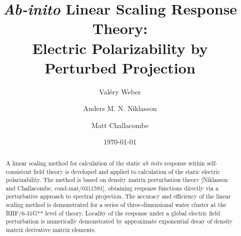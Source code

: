 \documentclass[prl,aps,preprint,showpacs,superbib]{revtex4}
\begin{document}
\title{\emph{Ab-inito} Linear Scaling Response Theory: \\ 
             Electric Polarizability by Perturbed Projection }

\author{Val\'ery Weber}
\author{Anders M. N. Niklasson}
\author{Matt Challacombe}

\date{\today}

\begin{abstract}
A linear scaling method for calculation of the static {\em ab inito} response within self-consistent field theory 
is developed and applied to calculation of the static electric polarizability.  The method is based on 
density matrix perturbation theory [Niklasson and Challacombe, cond-mat/0311591], obtaining  response functions
directly via a perturbative approach to spectral projection.
The accuracy and efficiency of the linear scaling method is demonstrated for a series of three-dimensional 
water cluster at the RHF/6-31G** level of theory.  Locality of the response under a global electric field 
perturbation is numerically demonstrated by approximate exponential decay of density matrix derivative matrix elements.
\end{abstract}


\maketitle

\end{document}
